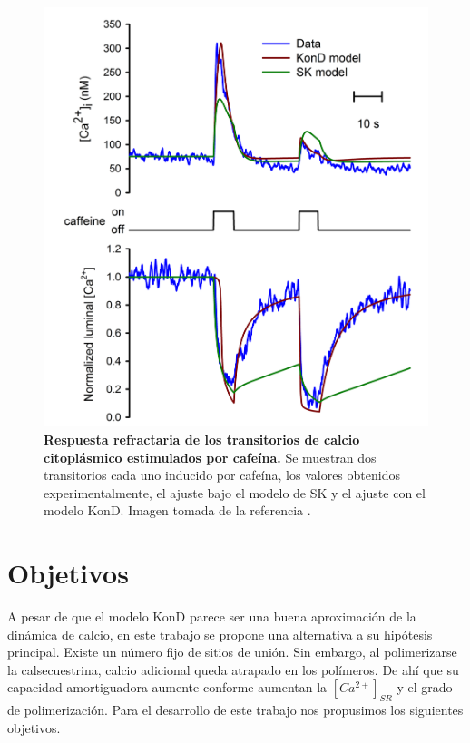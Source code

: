 \documentclass[draft]{article}
\newcommand{\Cal}{[Ca^{2+}]_{SR}}
\begin{document}
\begin{figure}[h]
	\centering
	\includegraphics{FIGURA8}
	\caption{\textbf{Respuesta refractaria de los transitorios de calcio citoplásmico estimulados por cafeína.} Se muestran dos transitorios cada uno inducido por cafeína, los valores obtenidos experimentalmente, el ajuste bajo el modelo de SK y el ajuste con el modelo KonD. Imagen tomada de la referencia \cite{Perez-Rosas2015}.}
	\label{fig:FIGURA8}
\end{figure}


\section{Objetivos}

A pesar de que el modelo KonD parece ser una buena aproximación de la dinámica de calcio, en este trabajo se propone una alternativa a su hipótesis principal. Existe un número fijo de sitios de unión. Sin embargo, al polimerizarse la calsecuestrina, calcio adicional queda atrapado en los polímeros. De ahí que su capacidad amortiguadora aumente conforme aumentan la $\Cal$ y el grado de polimerización. Para el desarrollo de este trabajo nos propusimos los siguientes objetivos.
\end{document}
